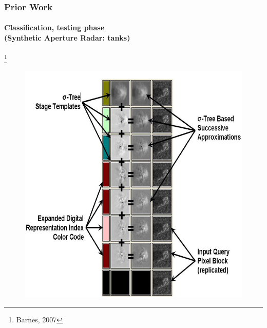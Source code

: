 \begin{frame}
\frametitle{Prior Work}
\framesubtitle{\small Classification, testing phase \\(Synthetic Aperture Radar: tanks)}
\logoCSIPCPL\mypagenum\footnote{Barnes, 2007}
	\begin{figure}		
		\includegraphics[height=0.7\textheight]{figs/RVQ_SARtank_3_reconstruction.png}			
	\end{figure}
\end{frame}




